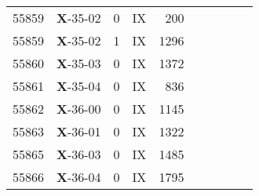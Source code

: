 \begin{table*}
\begin{tabular}{llllrllllr}
55859&\textbf{X}-35-02&0&IX&200&&&&&\\
55859&\textbf{X}-35-02&1&IX&1296&&&&&\\
55860&\textbf{X}-35-03&0&IX&1372&&&&&\\
55861&\textbf{X}-35-04&0&IX&836&&&&&\\
55862&\textbf{X}-36-00&0&IX&1145&&&&&\\
55863&\textbf{X}-36-01&0&IX&1322&&&&&\\
55865&\textbf{X}-36-03&0&IX&1485&&&&&\\
55866&\textbf{X}-36-04&0&IX&1795&&&&&\\
\hline
\hline
\end{tabular}
\end{table*}